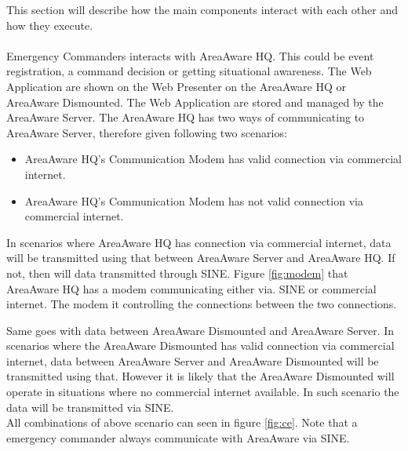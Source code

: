 This section will describe how the main components interact with each other and how they execute.\\\\
\noindent Emergency Commanders interacts with AreaAware HQ.
This could be event registration, a command decision or getting situational awareness.
The Web Application are shown on the Web Presenter on the AreaAware HQ or AreaAware Dismounted.
The Web Application are stored and managed by the AreaAware Server.
The AreaAware HQ has two ways of communicating to AreaAware Server, therefore given following two scenarios:
\begin{itemize}
\item AreaAware HQ's Communication Modem has valid connection via commercial internet.
\item AreaAware HQ's Communication Modem has not valid connection via commercial internet.
\end{itemize}
In scenarios where AreaAware HQ has connection via commercial internet, data will be transmitted using that between AreaAware Server and AreaAware HQ.
If not, then will data transmitted through SINE.
Figure \ref{fig:modem} that AreaAware HQ has a modem communicating either via. SINE or commercial internet. The modem it controlling the connections between the two connections.


\noindent Same goes with data between AreaAware Dismounted and AreaAware Server.
In scenarios where the AreaAware Dismounted has valid connection via commercial internet, data between AreaAware Server and AreaAware Dismounted will be transmitted using that.
However it is likely that the AreaAware Dismounted will operate in situations where no commercial internet available.
In such scenario the data will be transmitted via SINE.\\

\noindent All combinations of above scenario can seen in figure \ref{fig:ce}.
Note that a emergency commander always communicate with AreaAware via SINE.

